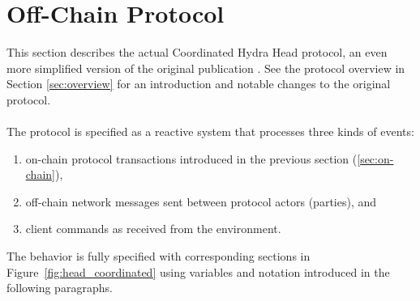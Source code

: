 \section{Off-Chain Protocol}\label{sec:offchain}

This section describes the actual Coordinated Hydra Head protocol, an even more simplified version of the original publication \cite{hydrahead20}. See the protocol overview in Section \ref{sec:overview} for an introduction and notable changes to the original protocol.\\
\\
The protocol is specified as a reactive system that processes three kinds of events:
\begin{enumerate}
  \item on-chain protocol transactions introduced in the previous section (\ref{sec:on-chain}),
  \item off-chain network messages sent between protocol actors (parties), and
  \item client commands as received from the environment.
\end{enumerate}

The behavior is fully specified with corresponding sections in
Figure~\ref{fig:head_coordinated} using variables and notation introduced in the
following paragraphs.

